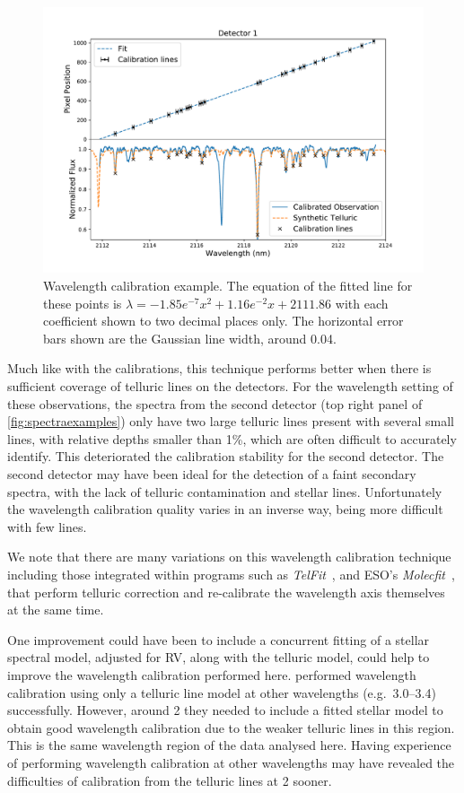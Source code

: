 \begin{figure}
    \centering
    \includegraphics[width=0.8\linewidth]{figures/reduction/calibration.pdf}
    \caption{Wavelength calibration example.
    The equation of the fitted line for these points is $\lambda = -1.85e^{-7} x^2 + 1.16e^{-2} x + 2111.86$ with each coefficient shown to two decimal places only.
The horizontal error bars shown are the Gaussian line width, around 0.04\nm{}.}
    \label{fig:wl_calibration}
\end{figure}

Much like with the \thar{} calibrations, this technique performs better when there is sufficient coverage of telluric lines on the detectors.
For the wavelength setting of these observations, the spectra from the second detector (top right panel of \cref{fig:spectraexamples}) only have two large telluric lines present with several small lines, with relative depths smaller than 1\%, which are often difficult to accurately identify.
This deteriorated the calibration stability for the second detector.
The second detector may have been ideal for the detection of a faint secondary spectra, with the lack of telluric contamination and stellar lines.
Unfortunately the wavelength calibration quality varies in an inverse way, being more difficult with few lines.

We note that there are many variations on this wavelength calibration technique including those integrated within programs such as \emph{TelFit}~\citet{gullikson_correcting_2014}, and {ESO}'s \emph{Molecfit}~\citet{smette_molecfit_2015}, that perform telluric correction and re-calibrate the wavelength axis themselves at the same time.

One improvement could have been to include a concurrent fitting of a stellar spectral model, adjusted for {RV}, along with the telluric model, could help to improve the wavelength calibration performed here. \citet{piskorz_evidence_2016} performed wavelength calibration using only a telluric line model at other \nir{} wavelengths {\red{} (e.g.\ 3.0--3.4\um{})} successfully.
However, around 2\um{} they needed to include a fitted stellar model to obtain good wavelength calibration due to the weaker telluric lines in this region.
This is the same wavelength region of the data analysed here.
Having experience of performing wavelength calibration at other wavelengths may have revealed the difficulties of calibration from the telluric lines at 2\um{} sooner.

